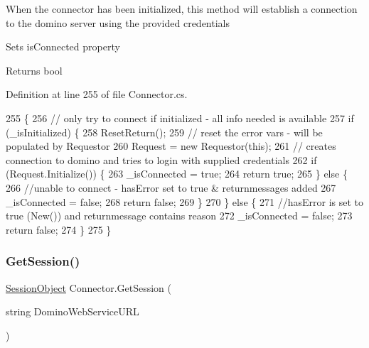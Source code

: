When the connector has been initialized, this method will establish a connection to the domino server using the provided credentials 

Sets is\+Connected property

\begin{DoxyReturn}{Returns}
bool
\end{DoxyReturn}


Definition at line 255 of file Connector.\+cs.


\begin{DoxyCode}
255                           \{
256         \textcolor{comment}{// only try to connect if initialized - all info needed is available}
257         \textcolor{keywordflow}{if} (\_isInitialized) \{
258             ResetReturn();
259             \textcolor{comment}{// reset the error vars - will be populated by Requestor}
260             Request = \textcolor{keyword}{new} Requestor(\textcolor{keyword}{this});
261             \textcolor{comment}{// creates connection to domino and tries to login with supplied credentials}
262             \textcolor{keywordflow}{if} (Request.Initialize()) \{
263                 \_isConnected = \textcolor{keyword}{true};
264                 \textcolor{keywordflow}{return} \textcolor{keyword}{true};
265             \} \textcolor{keywordflow}{else} \{
266                 \textcolor{comment}{//unable to connect - hasError set to true & returnmessages added}
267                 \_isConnected = \textcolor{keyword}{false};
268                 \textcolor{keywordflow}{return} \textcolor{keyword}{false};
269             \}
270         \} \textcolor{keywordflow}{else} \{
271             \textcolor{comment}{//hasError is set to true (New()) and returnmessage contains reason}
272             \_isConnected = \textcolor{keyword}{false};
273             \textcolor{keywordflow}{return} \textcolor{keyword}{false};
274         \}
275     \}
\end{DoxyCode}
\mbox{\label{class_connector_a5d089c1639f255966f00b2b05add0993}} 
\subsubsection{\texorpdfstring{Get\+Session()}{GetSession()}}
{\footnotesize\ttfamily \mbox{\hyperlink{class_session_object}{Session\+Object}} Connector.\+Get\+Session (\begin{DoxyParamCaption}\item[{string}]{Domino\+Web\+Service\+U\+RL }\end{DoxyParamCaption})}



